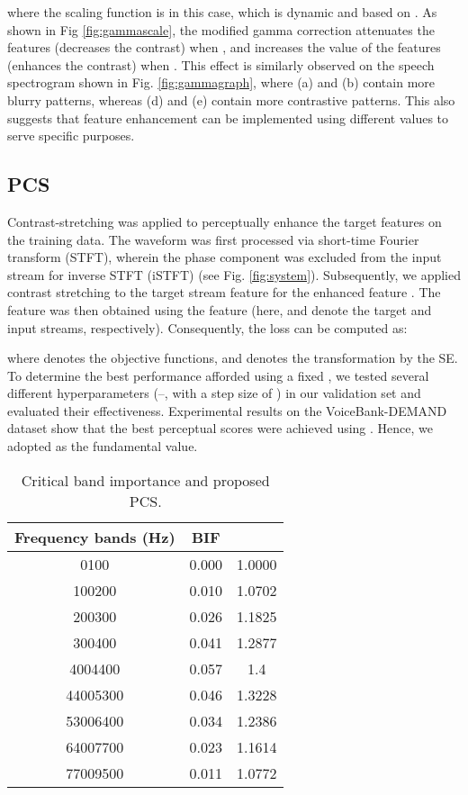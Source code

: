 \documentclass[a4paper]{article}
\begin{document}
where the scaling function  is  in this case, which is dynamic and based on . As shown in Fig \ref{fig:gammascale}, the modified gamma correction attenuates the features (decreases the contrast) when , and increases the value of the features (enhances the contrast) when . This effect is similarly observed on the speech spectrogram shown in Fig. \ref{fig:gammagraph}, where (a) and (b) contain more blurry patterns, whereas (d) and (e) contain more contrastive patterns. This also suggests that feature enhancement can be implemented using different  values to serve specific purposes. 

\subsection{PCS}
Contrast-stretching was applied to perceptually enhance the target features on the training data. The waveform was first processed via short-time Fourier transform (STFT), wherein the phase component was excluded from the input stream for inverse STFT (iSTFT) (see Fig. \ref{fig:system}). Subsequently, we applied contrast stretching to the target stream feature for the enhanced feature . The  feature was then obtained using the feature (here,  and  denote the target and input streams, respectively). Consequently, the loss  can be computed as:

where  denotes the objective functions, and  denotes the transformation by the SE. To determine the best performance afforded using a fixed , we tested several different hyperparameters (–, with a step size of ) in our validation set and evaluated their effectiveness. Experimental results on the VoiceBank-DEMAND dataset show that the best perceptual scores were achieved using . Hence, we adopted  as the fundamental  value. 
\begin{table}[h]
\centering
\caption{Critical band importance and proposed PCS.}
\label{tab:table_PCS}
\begin{tabular}[\linewidth]{|c|c|c|}
\hline
Frequency bands (Hz) & BIF & \boldsymbol{} \\
\hline 
0100           & 0.000 & 1.0000  \\
100200         & 0.010 & 1.0702  \\
200300         & 0.026 & 1.1825  \\
300400         & 0.041 & 1.2877   \\
4004400        & 0.057 & 1.4    \\
44005300       & 0.046 & 1.3228   \\
53006400       & 0.034 & 1.2386   \\
64007700       & 0.023 & 1.1614   \\
77009500       & 0.011 & 1.0772  \\
\hline
\end{tabular}
\end{table}
\end{document}
